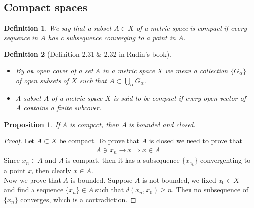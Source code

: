 \documentclass[12pt,leqno]{amsart}
\newtheorem{proposition}{Proposition}[section]
\newtheorem{definition}{Definition}[section]
\theoremstyle{definition}
\begin{document}
\medskip

\subsection{Compact spaces}
\begin{definition}
We say that a subset $A\subset X$ of a metric space is compact if every sequence in $A$ has a subsequence converging to a point in $A$.
\end{definition}

\begin{definition}[Definition 2.31 \& 2.32 in Rudin's book]
$ $
\begin{itemize}
  \item By an open cover of a set $A$ in a metric space $X$ we mean a collection $\{G_\alpha\}$ of open subsets of $X$ such that $A\subset \bigcup_\alpha G_\alpha$.
  \item A subset $A$ of a metric space $X$ is said to be compact if every open vector of $A$ contains a finite subcover.
\end{itemize}
\end{definition}

\begin{proposition}
If $A$ is compact, then $A$ is bounded and closed.
\end{proposition}
\begin{proof}
Let $A\subset X$ be compact. To prove that $A$ is closed we need to prove that 
\begin{align*}
    A\ni x_n\to x \Rightarrow x\in A
\end{align*}
Since $x_n\in A$ and $A$ is compact, then it has a subsequence $\{x_{n_k}\}$ convergenting to a point $x$, then clearly $x\in A$. \\
\hspace*{3em}Now we prove that $A$ is bounded. Suppose $A$ is not bounded, we fixed $x_0\in X$ and find a sequence $\{x_n\}\in A$ such that $d(x_n, x_0) \geq n$. Then no subsequence of $\{x_n\}$ converges, which is a contradiction.
\end{proof}
\end{document}
